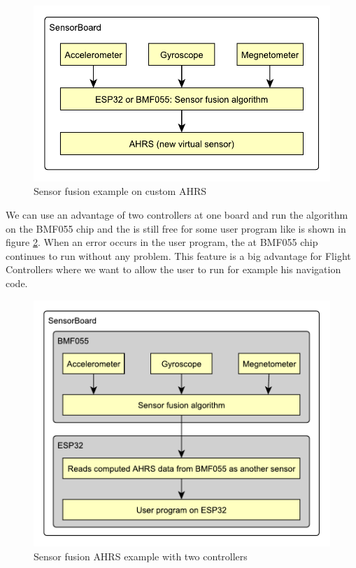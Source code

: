 \begin{figure}
    \centering
    \caption{Sensor fusion example on custom \ac{AHRS}}
    \label{UEAHRS}
    \includegraphics[scale=1]{img/UsageExamplesAHRS.pdf}
\end{figure}

We can use an advantage of two controllers at one board and run the  algorithm on the BMF055 chip and the  is still free for some user program like is shown in figure \ref{UEAHRSBMF}. When an error occurs in the user program, the  at BMF055 chip continues to run without any problem. This feature is a big advantage for Flight Controllers where we want to allow the user to run for example his navigation code.

\begin{figure}
    \centering
    \caption{Sensor fusion \ac{AHRS} example with two controllers}
    \label{UEAHRSBMF}
    \includegraphics[scale=1]{img/UsageExamplesAHRSBMF.pdf}
\end{figure}

